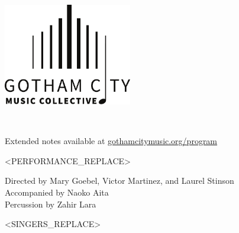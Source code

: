 \documentclass{article}[10pt]
\newcommand{\logo}{
        {\includegraphics[width=0.42\textwidth]{../../graphic_design_assets/bw_logo_full}}
}
\newcommand{\tunedspacesmall}{\vspace{0.07in}}
\begin{document}
    \begin{center}

        \logo

        \tunedspacesmall


        {\footnotesize\textbf{}}

        \tunedspacesmall

        {
            \textbf{}\\

            \tunedspacesmall

            \footnotesize{
                Extended notes available at
                \href{https://gothamcitymusic.org/program}{gothamcitymusic.org/program}
            }
        }

        \tunedspacesmall

        \begin{minipage}{\textwidth}
            \begin{flushright}

                <PERFORMANCE_REPLACE>

            \end{flushright}
        \end{minipage}

        \tunedspacesmall

        {
            \textbf{}

            \tunedspacesmall

            \begin{small}
                Directed by
                Mary Goebel,
                Victor Martinez,
                and
                Laurel Stinson\\
                Accompanied by Naoko Aita\\
                Percussion by Zahir Lara
            \end{small}

            \vspace{-0.1in}

            \begin{multicols*}{3}
                \begin{center}
                    \begin{small}
                        <SINGERS_REPLACE>
                    \end{small}
                \end{center}
            \end{multicols*}
        }
    \end{center}
\end{document}

